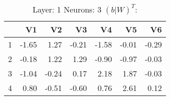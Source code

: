 \begin{table}[ht]
\centering
\begin{tabular}{rrrrrrr}
  \hline
 & V1 & V2 & V3 & V4 & V5 & V6 \\ 
  \hline
1 & -1.65 & 1.27 & -0.21 & -1.58 & -0.01 & -0.29 \\ 
  2 & -0.18 & 1.22 & 1.29 & -0.90 & -0.97 & -0.03 \\ 
  3 & -1.04 & -0.24 & 0.17 & 2.18 & 1.87 & -0.03 \\ 
  4 & 0.80 & -0.51 & -0.60 & 0.76 & 2.61 & 0.12 \\ 
   \hline
\end{tabular}
\caption{Layer: 1 Neurons: 3  $(b|W)^T$: 
} 
\end{table}
